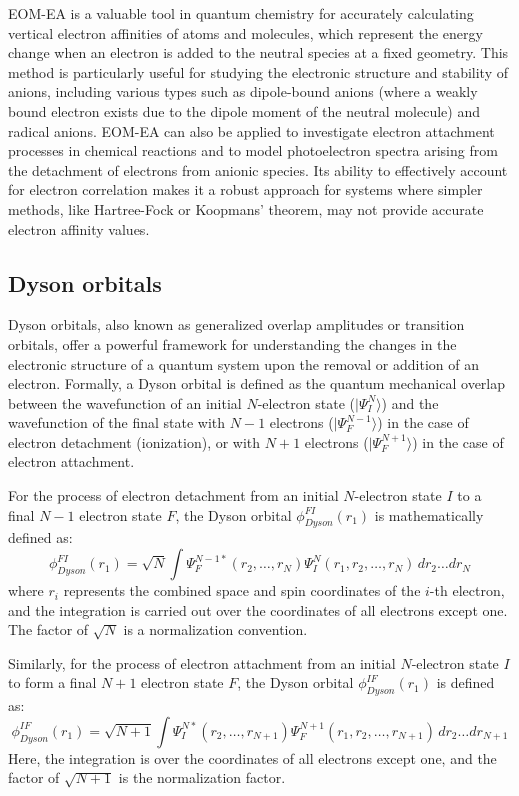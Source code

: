 EOM-EA is a valuable tool in quantum chemistry for accurately calculating vertical electron affinities of atoms and molecules, which represent the energy change when an electron is added to the neutral species at a fixed geometry. This method is particularly useful for studying the electronic structure and stability of anions, including various types such as dipole-bound anions (where a weakly bound electron exists due to the dipole moment of the neutral molecule) and radical anions. EOM-EA can also be applied to investigate electron attachment processes in chemical reactions and to model photoelectron spectra arising from the detachment of electrons from anionic species. Its ability to effectively account for electron correlation makes it a robust approach for systems where simpler methods, like Hartree-Fock or Koopmans' theorem, may not provide accurate electron affinity values.

\subsection{Dyson orbitals}

Dyson orbitals, also known as generalized overlap amplitudes or transition orbitals, offer a powerful framework for understanding the changes in the electronic structure of a quantum system upon the removal or addition of an electron. Formally, a Dyson orbital is defined as the quantum mechanical overlap between the wavefunction of an initial $N$-electron state ($|\Psi_I^N\rangle$) and the wavefunction of the final state with $N-1$ electrons ($|\Psi_F^{N-1}\rangle$) in the case of electron detachment (ionization), or with $N+1$ electrons ($|\Psi_F^{N+1}\rangle$) in the case of electron attachment.  

For the process of electron detachment from an initial $N$-electron state $I$ to a final $N-1$ electron state $F$, the Dyson orbital $\phi_{Dyson}^{FI}(r_1)$ is mathematically defined as:
\begin{equation}
    \phi_{Dyson}^{FI}(r_1) = \sqrt{N} \int \Psi_F^{N-1*}(r_2,\dots,r_N) \Psi_I^N(r_1, r_2,\dots,r_N)\,dr_2 \dots dr_N
\end{equation}
where $r_i$ represents the combined space and spin coordinates of the $i$-th electron, and the integration is carried out over the coordinates of all electrons except one. The factor of $\sqrt{N}$ is a normalization convention. 

Similarly, for the process of electron attachment from an initial $N$-electron state $I$ to form a final $N+1$ electron state $F$, the Dyson orbital $\phi_{Dyson}^{IF}(r_1)$ is defined as:
\begin{equation}
    \phi_{Dyson}^{IF}(r_1) = \sqrt{N+1} \int \Psi_I^{N*}(r_2,\dots,r_{N+1}) \Psi_F^{N+1}(r_1, r_2,\dots,r_{N+1})\,dr_2 \dots dr_{N+1}
\end{equation}
Here, the integration is over the coordinates of all electrons except one, and the factor of $\sqrt{N+1}$ is the normalization factor.

